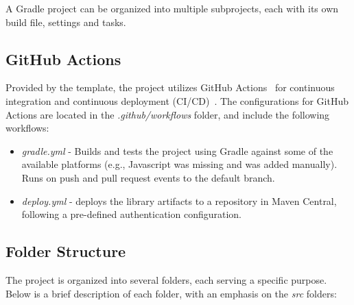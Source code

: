 A Gradle project can be organized into multiple subprojects, each with its own build file, settings and tasks.

\subsection{GitHub Actions}\label{subsec:github-actions}

Provided by the template, the project utilizes GitHub Actions~\cite{github-actions} for continuous integration and continuous deployment (CI/CD)~\cite{redhat-cicd}.
The configurations for GitHub Actions are located in the \textit{.github/workflows} folder, and include the following workflows:

\begin{itemize}
    \item \textit{gradle.yml} - Builds and tests the project using Gradle against some of the available platforms (e.g., Javascript was missing and was added manually).
    Runs on push and pull request events to the default branch.
    \item \textit{deploy.yml} - deploys the library artifacts to a repository in Maven Central, following a pre-defined authentication configuration.
\end{itemize}

\subsection{Folder Structure}\label{subsec:folder-structure}

The project is organized into several folders, each serving a specific purpose.
Below is a brief description of each folder, with an emphasis on the \textit{src} folders:


